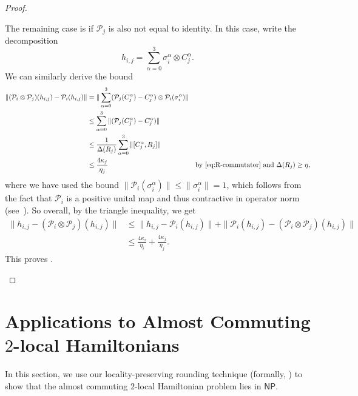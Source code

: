 \documentclass[11pt]{article}
\theoremstyle{plain}
\renewcommand{\cP}{\mathcal{P}}
\begin{document}
\begin{proof}
\begin{enumerate}
The remaining case is if $\cP_j$ is also not equal to identity. In this case, write the decomposition
\[ h_{i,j} = \sum_{\alpha=0}^{3} \sigma_i^\alpha \otimes C_j^\alpha. \]
We can similarly derive the bound
\begin{align}
    \| (\cP_i \otimes \cP_j)(h_{i,j}) - \cP_i(h_{i,j}) \| &= \| \sum_{\alpha =0}^3 (\cP_j(C_j^\alpha) - C_j^\alpha) \otimes \cP_i(\sigma_i^\alpha) \| \\
    &\leq  \sum_{\alpha =0}^3 \| (\cP_j(C_j^\alpha) - C_j^\alpha) \| \\
    &\leq \frac{1}{\Delta(R_j)} \sum_{\alpha =0}^3 \| [C_j^\alpha, R_j] \| \\
    &\leq \frac{4\kappa_j}{\eta_j} & \text{by \Cref{eq:R-commutator} and } \Delta(R_j) \geq \eta,
\end{align}
where we have used the bound $\| \cP_i(\sigma_i^\alpha) \| \leq \| \sigma_i^\alpha \| = 1$, which follows from the fact that $\cP_i$ is a positive unital map and thus contractive in operator norm (see~\cite[Theorem~6.12]{Watrous_2018}). 
So overall, by the triangle inequality, we get
\begin{align}
    \| h_{i,j} - (\cP_i \otimes \cP_j)(h_{i,j})  \| &\leq \| h_{i,j} - \cP_i(h_{i,j}) \| + \| \cP_i(h_{i,j}) - (\cP_i \otimes \cP_j)(h_{i,j}) \| \\
    &\leq \frac{4\kappa_i}{\eta_i} + \frac{4\kappa_j}{\eta_j}.
\end{align}
This proves .
\end{enumerate}
\end{proof}

\section{Applications to Almost Commuting $2$-local Hamiltonians}
In this section, we use our locality-preserving rounding technique (formally,  ) to show that the almost commuting $2$-local Hamiltonian problem lies in $\mathsf{NP}$.
\end{document}
